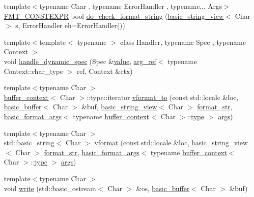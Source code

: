 \begin{DoxyCompactItemize}
\item 
{\footnotesize template$<$typename Char , typename Error\+Handler , typename... Args$>$ }\\\hyperlink{core_8h_a69201cb276383873487bf68b4ef8b4cd}{F\+M\+T\+\_\+\+C\+O\+N\+S\+T\+E\+X\+PR} bool \hyperlink{namespaceinternal_a66aacbf6c94133495990f76db13a7cd3}{do\+\_\+check\+\_\+format\+\_\+string} (\hyperlink{classbasic__string__view}{basic\+\_\+string\+\_\+view}$<$ Char $>$ s, Error\+Handler eh=Error\+Handler())
\item 
{\footnotesize template$<$template$<$ typename $>$ class Handler, typename Spec , typename Context $>$ }\\void \hyperlink{namespaceinternal_ad73bcd70ef8d078588a6264dd859e812}{handle\+\_\+dynamic\+\_\+spec} (Spec \&\hyperlink{classinternal_1_1value}{value}, \hyperlink{structinternal_1_1arg__ref}{arg\+\_\+ref}$<$ typename Context\+::char\+\_\+type $>$ ref, Context \&ctx)
\item 
{\footnotesize template$<$typename Char $>$ }\\\hyperlink{structbuffer__context}{buffer\+\_\+context}$<$ Char $>$\+::type\+::iterator \hyperlink{namespaceinternal_acc6b15a4992910ac85ba84aa7dfede48}{vformat\+\_\+to} (const std\+::locale \&loc, \hyperlink{classinternal_1_1basic__buffer}{basic\+\_\+buffer}$<$ Char $>$ \&buf, \hyperlink{classbasic__string__view}{basic\+\_\+string\+\_\+view}$<$ Char $>$ \hyperlink{format_8h_aa2b402011ee0619f2158f13e0827e585}{format\+\_\+str}, \hyperlink{classbasic__format__args}{basic\+\_\+format\+\_\+args}$<$ typename \hyperlink{structbuffer__context}{buffer\+\_\+context}$<$ Char $>$\+::\hyperlink{namespaceinternal_a8661864098ac0acff9a6dd7e66f59038}{type} $>$ \hyperlink{printf_8h_a47047b7b28fd1342eef756b79c778580}{args})
\item 
{\footnotesize template$<$typename Char $>$ }\\std\+::basic\+\_\+string$<$ Char $>$ \hyperlink{namespaceinternal_a1904f9fcad1333e8658da7816f8df368}{vformat} (const std\+::locale \&loc, \hyperlink{classbasic__string__view}{basic\+\_\+string\+\_\+view}$<$ Char $>$ \hyperlink{format_8h_aa2b402011ee0619f2158f13e0827e585}{format\+\_\+str}, \hyperlink{classbasic__format__args}{basic\+\_\+format\+\_\+args}$<$ typename \hyperlink{structbuffer__context}{buffer\+\_\+context}$<$ Char $>$\+::\hyperlink{namespaceinternal_a8661864098ac0acff9a6dd7e66f59038}{type} $>$ \hyperlink{printf_8h_a47047b7b28fd1342eef756b79c778580}{args})
\item 
{\footnotesize template$<$typename Char $>$ }\\void \hyperlink{namespaceinternal_a1d6eb1d297ebb5fc0f724732f23b22eb}{write} (std\+::basic\+\_\+ostream$<$ Char $>$ \&os, \hyperlink{classinternal_1_1basic__buffer}{basic\+\_\+buffer}$<$ Char $>$ \&buf)

\end{DoxyCompactItemize}
